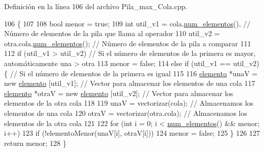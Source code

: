 Definición en la línea 106 del archivo Pila\+\_\+max\+\_\+\+Cola.\+cpp.


\begin{DoxyCode}
106                                                    \{
107 
108     \textcolor{keywordtype}{bool} menor = \textcolor{keyword}{true};
109     \textcolor{keywordtype}{int} util\_v1 = cola.\hyperlink{classCola_a26e5b0df5411aa23114d790f0a8c023b}{num\_elementos}(),                                         \textcolor{comment}{// Número de
       elementos de la pila que llama al operador}
110         util\_v2 = otra.cola.\hyperlink{classCola_a26e5b0df5411aa23114d790f0a8c023b}{num\_elementos}();                                    \textcolor{comment}{// Número de
       elementos de la pila a comparar}
111     
112     \textcolor{keywordflow}{if} (util\_v1 > util\_v2)                                                      \textcolor{comment}{// Si el número de
       elementos de la primera es mayor, automáticamente una > otra}
113         menor = \textcolor{keyword}{false};
114     \textcolor{keywordflow}{else} \textcolor{keywordflow}{if} (util\_v1 == util\_v2)\{                                               \textcolor{comment}{// Si el número de
       elementos de la primera es igual}
115         
116         \hyperlink{structelemento}{elemento} *unaV = \textcolor{keyword}{new} \hyperlink{structelemento}{elemento} [util\_v1];                                \textcolor{comment}{// Vector
       para almacenar los elementos de una cola}
117         \hyperlink{structelemento}{elemento} *otraV = \textcolor{keyword}{new} \hyperlink{structelemento}{elemento} [util\_v2];                               \textcolor{comment}{// Vector
       para almacenar los elementos de la otra cola}
118         
119         unaV = vectorizar(cola);                                                \textcolor{comment}{// Almacenamos los
       elementos de una cola}
120         otraV = vectorizar(otra.cola);                                          \textcolor{comment}{// Almacenamos los
       elementos de la otra cola}
121         
122         \textcolor{keywordflow}{for} (\textcolor{keywordtype}{int} i = 0; i < \hyperlink{classPila__max_a693ba4373cac8db4d820ff6c76d6d8da}{num\_elementos}() && menor; i++)
123             \textcolor{keywordflow}{if} (!elementoMenor(unaV[i], otraV[i]))
124                 menor = \textcolor{keyword}{false};
125     \}
126     
127     \textcolor{keywordflow}{return} menor;
128 \}
\end{DoxyCode}
\mbox{\label{classPila__max_a8806f343ed75ecf695db7a307b6f65ed}} 
